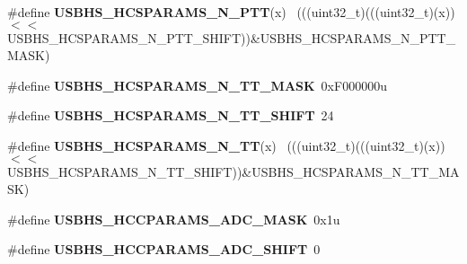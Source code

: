 \begin{DoxyCompactItemize}
\item 
\hypertarget{group___u_s_b_h_s___register___masks_ga2d7b041f4763e3d9d3c747c262c7902c}{}\#define {\bfseries U\+S\+B\+H\+S\+\_\+\+H\+C\+S\+P\+A\+R\+A\+M\+S\+\_\+\+N\+\_\+\+P\+T\+T}(x)                              ~(((uint32\+\_\+t)(((uint32\+\_\+t)(x))$<$$<$U\+S\+B\+H\+S\+\_\+\+H\+C\+S\+P\+A\+R\+A\+M\+S\+\_\+\+N\+\_\+\+P\+T\+T\+\_\+\+S\+H\+I\+F\+T))\&U\+S\+B\+H\+S\+\_\+\+H\+C\+S\+P\+A\+R\+A\+M\+S\+\_\+\+N\+\_\+\+P\+T\+T\+\_\+\+M\+A\+S\+K)\label{group___u_s_b_h_s___register___masks_ga2d7b041f4763e3d9d3c747c262c7902c}

\item 
\hypertarget{group___u_s_b_h_s___register___masks_ga32c481f121e13e9786db3fd3b9db520c}{}\#define {\bfseries U\+S\+B\+H\+S\+\_\+\+H\+C\+S\+P\+A\+R\+A\+M\+S\+\_\+\+N\+\_\+\+T\+T\+\_\+\+M\+A\+S\+K}~0x\+F000000u\label{group___u_s_b_h_s___register___masks_ga32c481f121e13e9786db3fd3b9db520c}

\item 
\hypertarget{group___u_s_b_h_s___register___masks_ga2420f28cbd49361ca9c56e74ed6b934c}{}\#define {\bfseries U\+S\+B\+H\+S\+\_\+\+H\+C\+S\+P\+A\+R\+A\+M\+S\+\_\+\+N\+\_\+\+T\+T\+\_\+\+S\+H\+I\+F\+T}~24\label{group___u_s_b_h_s___register___masks_ga2420f28cbd49361ca9c56e74ed6b934c}

\item 
\hypertarget{group___u_s_b_h_s___register___masks_gac1a042015c14851dac5b0fd6bf554eaa}{}\#define {\bfseries U\+S\+B\+H\+S\+\_\+\+H\+C\+S\+P\+A\+R\+A\+M\+S\+\_\+\+N\+\_\+\+T\+T}(x)                                ~(((uint32\+\_\+t)(((uint32\+\_\+t)(x))$<$$<$U\+S\+B\+H\+S\+\_\+\+H\+C\+S\+P\+A\+R\+A\+M\+S\+\_\+\+N\+\_\+\+T\+T\+\_\+\+S\+H\+I\+F\+T))\&U\+S\+B\+H\+S\+\_\+\+H\+C\+S\+P\+A\+R\+A\+M\+S\+\_\+\+N\+\_\+\+T\+T\+\_\+\+M\+A\+S\+K)\label{group___u_s_b_h_s___register___masks_gac1a042015c14851dac5b0fd6bf554eaa}

\item 
\hypertarget{group___u_s_b_h_s___register___masks_ga134751d5ac62bed20311e5e10ed3f12e}{}\#define {\bfseries U\+S\+B\+H\+S\+\_\+\+H\+C\+C\+P\+A\+R\+A\+M\+S\+\_\+\+A\+D\+C\+\_\+\+M\+A\+S\+K}~0x1u\label{group___u_s_b_h_s___register___masks_ga134751d5ac62bed20311e5e10ed3f12e}

\item 
\hypertarget{group___u_s_b_h_s___register___masks_ga4f6299c431907f986abb8d9ecccd2e38}{}\#define {\bfseries U\+S\+B\+H\+S\+\_\+\+H\+C\+C\+P\+A\+R\+A\+M\+S\+\_\+\+A\+D\+C\+\_\+\+S\+H\+I\+F\+T}~0\label{group___u_s_b_h_s___register___masks_ga4f6299c431907f986abb8d9ecccd2e38}


\end{DoxyCompactItemize}
